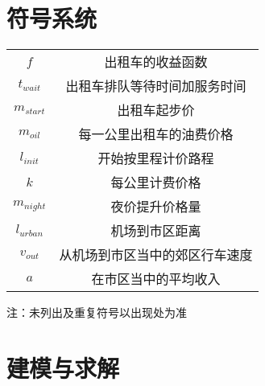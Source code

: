\documentclass{cumcmthesis}
\begin{document}
\newpage
\section{符号系统}
\begin{center}
	\begin{tabular}{cc}
		\hline
		\makebox[0.3\textwidth][c]{符号} & \makebox[0.4\textwidth][c]{意义} \\ \hline
		$f$                              & 出租车的收益函数                 \\ \hline
		$t_{wait}$                       & 出租车排队等待时间加服务时间     \\ \hline
		$m_{start}$                      & 出租车起步价                     \\ \hline
		$m_{oil}$                        & 每一公里出租车的油费价格         \\ \hline
		$l_{init}$                       & 开始按里程计价路程               \\ \hline
		$k$                              & 每公里计费价格                   \\ \hline
		$m_{night}$                      & 夜价提升价格量                   \\ \hline
		$l_{urban}$                      & 机场到市区距离                   \\ \hline
		$v_{out}$                        & 从机场到市区当中的郊区行车速度   \\ \hline
		$a$                              & 在市区当中的平均收入             \\ \hline
	\end{tabular}
\end{center}

注：未列出及重复符号以出现处为准

\newpage
\section{建模与求解}
\end{document}
